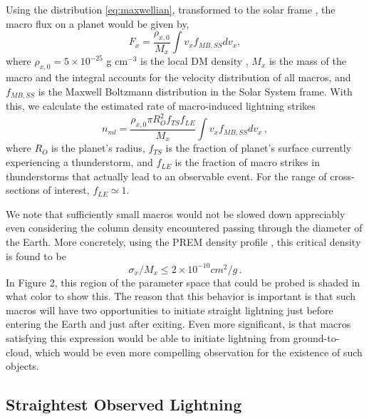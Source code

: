 \documentclass[%
 reprint,
 amsmath,amssymb,
 aps,
]{revtex4-2}
\begin{document}
    Using the distribution \eqref{eq:maxwellian}, transformed to the solar frame \citep{Freese2013}, the macro flux on a planet would be given by,
    \begin{equation}\label{eq:planet_macro_flux}
        F_{x} = \frac{\rho_{x,0}}{M_{x}} \int v_{x} f_{MB,SS} dv_x,
    \end{equation}
    where $\rho_{x,0} = 5 \times 10^{-25}$ g cm$^{-3}$ is the local DM density \cite{Bovy2012}, $M_{x}$ is the mass of the macro and the integral accounts for the velocity distribution of all macros, and $f_{MB,SS}$ is the Maxwell Boltzmann distribution in the Solar System frame. With this, we calculate the estimated rate of macro-induced lightning strikes
    \begin{equation}\label{eq:macro_lightning_rate}
        n_{ml} = \frac{\rho_{x,0} \pi R_{O}^2 f_{TS} f_{LE}}{M_{x}}\int v_{x} f_{MB,SS} dv_x\,,
    \end{equation}
    where $R_{O}$ is the planet's radius, $f_{TS}$ is the fraction of planet's surface currently experiencing a thunderstorm, and $f_{LE}$ is the fraction of macro strikes in thunderstorms that actually lead to an observable event. For the range of cross-sections of interest, $f_{LE}\simeq1$.
    
    We note that sufficiently small macros would not be slowed down appreciably even considering the column density encountered passing through the diameter of the Earth. More concretely, using the PREM density profile \cite{PREM}, this critical density is found to be
    \begin{equation}\label{twicelightning}
        \sigma_x/M_x \leq 2\times 10^{-10} cm^2/g\,.
    \end{equation}
    In Figure 2, this region of the parameter space that could be probed is shaded in {\color{red} what color} to show this. The reason that this behavior is important is that such macros will have two opportunities to initiate straight lightning just before entering the Earth and just after exiting. Even more significant, is that macros satisfying this expression would be able to initiate lightning from ground-to-cloud, which would be even more compelling observation for the existence of such objects.

    \subsection{Straightest Observed Lightning} %
    \label{sub:straightest_observed_lightning}
\end{document}
